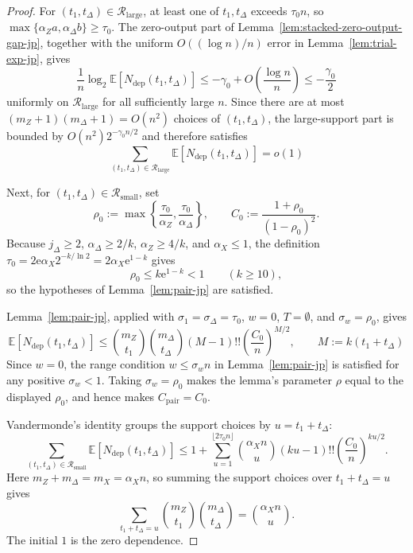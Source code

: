 \documentclass[11pt]{article}
\theoremstyle{definition}
\newcommand{\EE}{\mathbb E}
\begin{document}
\begin{proof}
For \((t_1,t_\Delta)\in \mathcal R_{\mathrm{large}}\), at least one of \(t_1,t_\Delta\) exceeds \(\tau_0 n\), so \(\max\{\alpha_Za,\alpha_\Delta b\}\ge\tau_0\). The zero-output part of Lemma~\ref{lem:stacked-zero-output-gap-jp}, together with the uniform \(O((\log n)/n)\) error in Lemma~\ref{lem:trial-exp-jp}, gives
\[
\frac1n\log_2 \EE[N_{\mathrm{dep}}(t_1,t_\Delta)]
\le -\gamma_0+O\!\left(\frac{\log n}{n}\right)
\le -\frac{\gamma_0}{2}
\]
uniformly on \(\mathcal R_{\mathrm{large}}\) for all sufficiently large \(n\).
Since there are at most \((m_Z+1)(m_\Delta+1)=O(n^2)\) choices of \((t_1,t_\Delta)\), the large-support part is bounded by \(O(n^2)2^{-\gamma_0 n/2}\) and therefore satisfies
\begin{equation*}
\sum_{(t_1,t_\Delta)\in\mathcal R_{\mathrm{large}}}
\EE[N_{\mathrm{dep}}(t_1,t_\Delta)]
=o(1)
\end{equation*}

Next, for \((t_1,t_\Delta)\in \mathcal R_{\mathrm{small}}\), set
\begin{equation*}
\rho_0:=\max\left\{\frac{\tau_0}{\alpha_Z},\frac{\tau_0}{\alpha_\Delta}\right\},
\qquad
C_0:=\frac{1+\rho_0}{(1-\rho_0)^2}.
\end{equation*}
Because \(j_\Delta\ge2\), \(\alpha_\Delta\ge2/k\), \(\alpha_Z\ge4/k\), and \(\alpha_X\le1\), the definition
\(\tau_0=2\mathrm{e}\alpha_X2^{-k/\ln2}=2\alpha_X \mathrm{e}^{1-k}\) gives
\[
\rho_0\le k\mathrm{e}^{1-k}<1
\qquad (k\ge10),
\]
so the hypotheses of Lemma~\ref{lem:pair-jp} are satisfied.

Lemma~\ref{lem:pair-jp}, applied with \(\sigma_1=\sigma_\Delta=\tau_0\), \(w=0\), \(T=\emptyset\), and \(\sigma_w=\rho_0\), gives
\begin{equation*}
\EE[N_{\mathrm{dep}}(t_1,t_\Delta)]
\le
\binom{m_Z}{t_1}\binom{m_\Delta}{t_\Delta}
(M-1)!!\left(\frac{C_0}{n}\right)^{M/2},
\qquad
M:=k(t_1+t_\Delta)
\end{equation*}
Since \(w=0\), the range condition \(w\le\sigma_w n\) in Lemma~\ref{lem:pair-jp} is satisfied for any positive \(\sigma_w<1\). Taking \(\sigma_w=\rho_0\) makes the lemma's parameter \(\rho\) equal to the displayed \(\rho_0\), and hence makes \(C_{\mathrm{pair}}=C_0\).

Vandermonde's identity \cite[Sec.~5.1, Vandermonde's convolution~(5.27)]{GKP94}
groups the support choices by \(u=t_1+t_\Delta\):
\begin{equation*}
\sum_{(t_1,t_\Delta)\in\mathcal R_{\mathrm{small}}}
\EE[N_{\mathrm{dep}}(t_1,t_\Delta)]
\le
1+\sum_{u=1}^{\lfloor2\tau_0 n\rfloor}
\binom{\alpha_X n}{u}(ku-1)!!
\left(\frac{C_0}{n}\right)^{ku/2}.
\end{equation*}
Here \(m_Z+m_\Delta=m_X=\alpha_X n\), so summing the support choices over \(t_1+t_\Delta=u\) gives
\[
\sum_{t_1+t_\Delta=u}\binom{m_Z}{t_1}\binom{m_\Delta}{t_\Delta}
=\binom{\alpha_X n}{u}.
\]
The initial \(1\) is the zero dependence.


\end{proof}
\end{document}
